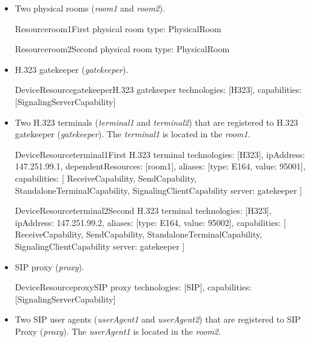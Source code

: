\begin{itemize}
\item Two physical rooms (\emph{room1} and \emph{room2}).

\begin{EntityExample}{Resource}{room1}{First physical room}
type: PhysicalRoom
\end{EntityExample}

\begin{EntityExample}{Resource}{room2}{Second physical room}
type: PhysicalRoom
\end{EntityExample}

\item H.323 gatekeeper (\emph{gatekeeper}).

\begin{EntityExample}{DeviceResource}{gatekeeper}{H.323 gatekeeper}
technologies: [H323], 
capabilities: [SignalingServerCapability]
\end{EntityExample}

\item Two H.323 terminals (\emph{terminal1} and \emph{terminal2}) that are
  registered to H.323 gatekeeper (\emph{gatekeeper}). The \emph{terminal1} is
  located in the \emph{room1}.
  
\begin{EntityExample}{DeviceResource}{terminal1}{First H.323 terminal}
technologies: [H323], 
ipAddress: 147.251.99.1,
dependentResources: [room1],
aliases: [{type: E164, value: 95001}],
capabilities: [
  ReceiveCapability, SendCapability,
  StandaloneTerminalCapability,
  SignalingClientCapability {server: gatekeeper}
]
\end{EntityExample}

\begin{EntityExample}{DeviceResource}{terminal2}{Second H.323 terminal}
technologies: [H323], 
ipAddress: 147.251.99.2,
aliases: [{type: E164, value: 95002}],
capabilities: [
  ReceiveCapability, SendCapability,
  StandaloneTerminalCapability,
  SignalingClientCapability {server: gatekeeper}
]
\end{EntityExample}

\item SIP proxy (\emph{proxy}).

\begin{EntityExample}{DeviceResource}{proxy}{SIP proxy}
technologies: [SIP], 
capabilities: [SignalingServerCapability]
\end{EntityExample}

\item Two SIP user agents (\emph{userAgent1} and \emph{userAgent2}) that are
  registered to SIP Proxy (\emph{proxy}). The \emph{userAgent1} is located in
  the \emph{room2}.
  

\end{itemize}
